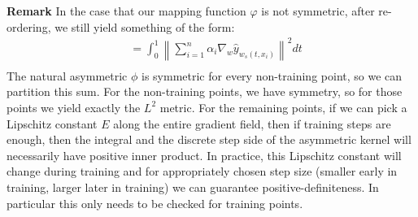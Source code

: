 \textbf{Remark } In the case that our mapping function $\varphi$ is not symmetric, after re-ordering, we still yield something of the form:
\begin{align}
&= \int_0^1 \left\lVert \sum_{i=1}^n \alpha_i \nabla_{w}\hat{y}_{w_s(t,x_i)}\right\rVert^2 dt \\
\end{align}
The natural asymmetric $\phi$ is symmetric for every non-training point, so we can partition this sum. For the non-training points, we have symmetry, so for those points we yield exactly the $L^2$ metric. For the remaining points, if we can pick a Lipschitz constant $E$ along the entire gradient field, then if training steps are enough, then the integral and the discrete step side of the asymmetric kernel will necessarily have positive inner product. In practice, this Lipschitz constant will change during training and for appropriately chosen step size (smaller early in training, larger later in training) we can guarantee positive-definiteness. In particular this only needs to be checked for training points. 

